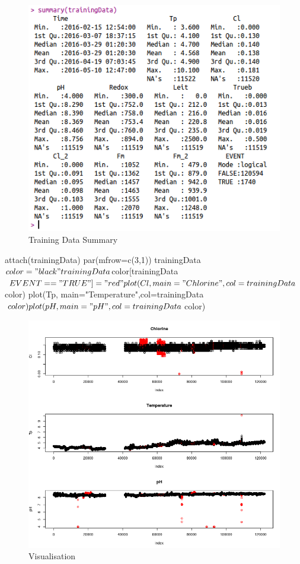 \documentclass[runningheads]{llncs}
\begin{document}
\begin{figure}
\includegraphics[width=1.2\linewidth]{trainingData.png}
\caption{Training Data Summary}
\label{fig:original}
\end{figure}

attach(trainingData)
par(mfrow=c(3,1))
trainingData$color = "black"
trainingData$color[trainingData$EVENT=="TRUE"] = "red"
plot(Cl, main="Chlorine",col=trainingData$color)
plot(Tp, main="Temperature",col=trainingData$color)
plot(pH, main="pH",col=trainingData$color)

\begin{figure}
\includegraphics[width=1.2\linewidth]{Tp_Cl_pH.png}
\caption{Visualisation}
\label{fig:original1}
\end{figure}
\end{document}
